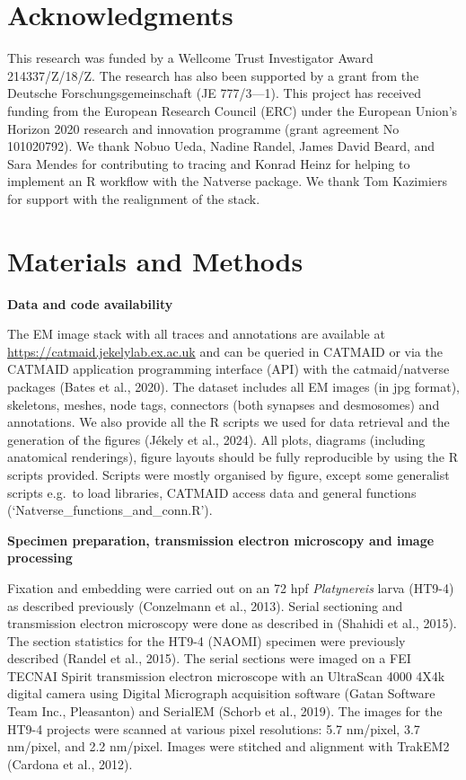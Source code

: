 \documentclass[
  11pt,
]{article}
\begin{document}
\section{Acknowledgments}\label{acknowledgments}

This research was funded by a Wellcome Trust Investigator Award
214337/Z/18/Z. The research has also been supported by a grant from the
Deutsche Forschungsgemeinschaft (JE 777/3---1). This project has
received funding from the European Research Council (ERC) under the
European Union's Horizon 2020 research and innovation programme (grant
agreement No 101020792). We thank Nobuo Ueda, Nadine Randel, James David
Beard, and Sara Mendes for contributing to tracing and Konrad Heinz for
helping to implement an R workflow with the Natverse package. We thank
Tom Kazimiers for support with the realignment of the stack.

\section{Materials and Methods}\label{materials-and-methods}

\textbf{Data and code availability}

The EM image stack with all traces and annotations are available at
\url{https://catmaid.jekelylab.ex.ac.uk} and can be queried in CATMAID
or via the CATMAID application programming interface (API) with the
catmaid/natverse packages (Bates et al., 2020). The dataset includes all
EM images (in jpg format), skeletons, meshes, node tags, connectors
(both synapses and desmosomes) and annotations. We also provide all the
R scripts we used for data retrieval and the generation of the figures
(Jékely et al., 2024). All plots, diagrams (including anatomical
renderings), figure layouts should be fully reproducible by using the R
scripts provided. Scripts were mostly organised by figure, except some
generalist scripts e.g.~to load libraries, CATMAID access data and
general functions (`Natverse\_functions\_and\_conn.R').

\textbf{Specimen preparation, transmission electron microscopy and image
processing}

Fixation and embedding were carried out on an 72 hpf \emph{Platynereis}
larva (HT9-4) as described previously (Conzelmann et al., 2013). Serial
sectioning and transmission electron microscopy were done as described
in (Shahidi et al., 2015). The section statistics for the HT9-4 (NAOMI)
specimen were previously described (Randel et al., 2015). The serial
sections were imaged on a FEI TECNAI Spirit transmission electron
microscope with an UltraScan 4000 4X4k digital camera using Digital
Micrograph acquisition software (Gatan Software Team Inc., Pleasanton)
and SerialEM (Schorb et al., 2019). The images for the HT9-4 projects
were scanned at various pixel resolutions: 5.7 nm/pixel, 3.7 nm/pixel,
and 2.2 nm/pixel. Images were stitched and alignment with TrakEM2
(Cardona et al., 2012).
\end{document}
